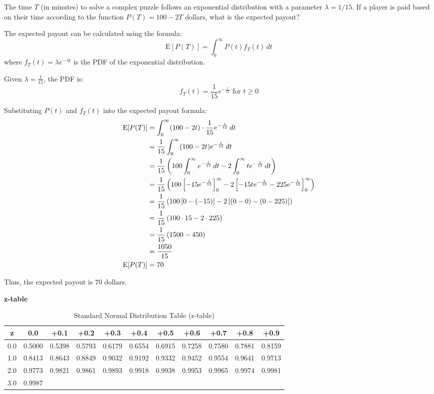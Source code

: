 \documentclass[a4paper, 10pt]{article}
\newcommand{\zScoreTable}[1]{
    \par\noindent \textbf{z-table}
    \begin{table}[h]
        \centering
        \renewcommand{\arraystretch}{#1}
        \begin{tabular}{|c|cccccccccc|}
            \hline
            \textbf{z} & 0.0 & +0.1 & +0.2 & +0.3 & +0.4 & +0.5 & +0.6 & +0.7 & +0.8 & +0.9 \\
            \hline
            0.0 & 0.5000 & 0.5398 & 0.5793 & 0.6179 & 0.6554 & 0.6915 & 0.7258 & 0.7580 & 0.7881 & 0.8159 \\
            1.0 & 0.8413 & 0.8643 & 0.8849 & 0.9032 & 0.9192 & 0.9332 & 0.9452 & 0.9554 & 0.9641 & 0.9713 \\
            2.0 & 0.9773 & 0.9821 & 0.9861 & 0.9893 & 0.9918 & 0.9938 & 0.9953 & 0.9965 & 0.9974 & 0.9981 \\
            3.0 & 0.9987 & & & & & & & & & \\
            \hline
        \end{tabular}
        \caption{Standard Normal Distribution Table (z-table)}
        \label{tab:z-table}
    \end{table}
}
\begin{document}
\newpage

\begin{problem}
The time \( T \) (in minutes) to solve a complex puzzle follows an exponential distribution with a parameter \( \lambda = 1/15 \).
If a player is paid based on their time according to the function \( P(T) = 100 - 2T \) dollars, what is the expected payout?
\end{problem}

\begin{solution}
The expected payout can be calculated using the formula:
\[ \text{E}[P(T)] = \int_{0}^{\infty} P(t) f_T(t) \, dt \]
where \( f_T(t) = \lambda e^{-\lambda t} \) is the PDF of the exponential distribution.

Given \( \lambda = \frac{1}{15} \), the PDF is:
\[ f_T(t) = \frac{1}{15} e^{-\frac{t}{15}} \text{ for } t \geq 0 \]

Substituting \( P(t) \) and \( f_T(t) \) into the expected payout formula:
\begin{align*}
    \text{E}[P(T)] &= \int_{0}^{\infty} (100 - 2t) \cdot \frac{1}{15} e^{-\frac{t}{15}} \, dt \\
    &= \frac{1}{15} \int_{0}^{\infty} (100 - 2t) e^{-\frac{t}{15}} \, dt \\
    &= \frac{1}{15} \left(100 \int_{0}^{\infty} e^{-\frac{t}{15}} \, dt - 2 \int_{0}^{\infty} t e^{-\frac{t}{15}} \, dt\right) \\
    &= \frac{1}{15} \left(100 \left[-15e^{-\frac{t}{15}}\right]_{0}^{\infty} - 2 \left[-15te^{-\frac{t}{15}} - 225e^{-\frac{t}{15}}\right]_{0}^{\infty}\right) \\
    &= \frac{1}{15} \left(100 \left[0 - (-15)\right] - 2 \left[(0 - 0) - (0 - 225)\right]\right) \\
    &= \frac{1}{15} \left(100 \cdot 15 - 2 \cdot 225\right) \\
    &= \frac{1}{15} \left(1500 - 450\right) \\
    &= \frac{1050}{15} \\
    \text{E}[P(T)] &= 70
\end{align*}

Thus, the expected payout is \( \boxed{70 \text{ dollars}} \).
\end{solution}

\vspace{1.5cm}

\zScoreTable{1.2}
\end{document}
